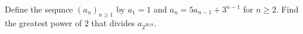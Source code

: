 Define the sequnce  ${(a_n)}_{n\ge1}$ by $a_1=1$ and $a_n=5a_{n-1}+3^{n-1}$ for $n\ge2$.
Find the greatest power of $2$ that divides $a_{2^{2019}}$.